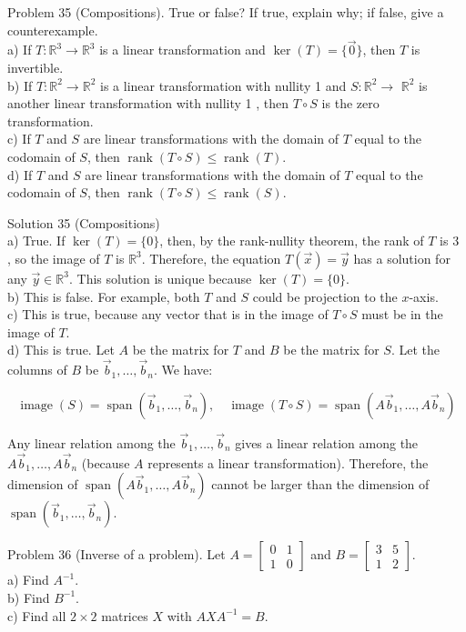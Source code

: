 \documentclass[10pt]{article}
\begin{document}
Problem 35 (Compositions). True or false? If true, explain why; if false, give a counterexample.\\
a) If $T: \mathbb{R}^{3} \rightarrow \mathbb{R}^{3}$ is a linear transformation and $\operatorname{ker}(T)=\{\overrightarrow{0}\}$, then $T$ is invertible.\\
b) If $T: \mathbb{R}^{2} \rightarrow \mathbb{R}^{2}$ is a linear transformation with nullity 1 and $S: \mathbb{R}^{2} \rightarrow$ $\mathbb{R}^{2}$ is another linear transformation with nullity 1 , then $T \circ S$ is the zero transformation.\\
c) If $T$ and $S$ are linear transformations with the domain of $T$ equal to the codomain of $S$, then $\operatorname{rank}(T \circ S) \leq \operatorname{rank}(T)$.\\
d) If $T$ and $S$ are linear transformations with the domain of $T$ equal to the codomain of $S$, then $\operatorname{rank}(T \circ S) \leq \operatorname{rank}(S)$.

Solution 35 (Compositions)\\
a) True. If $\operatorname{ker}(T)=\{0\}$, then, by the rank-nullity theorem, the rank of $T$ is 3 , so the image of $T$ is $\mathbb{R}^{3}$. Therefore, the equation $T(\vec{x})=\vec{y}$ has a solution for any $\vec{y} \in \mathbb{R}^{3}$. This solution is unique because $\operatorname{ker}(T)=\{0\}$.\\
b) This is false. For example, both $T$ and $S$ could be projection to the $x$-axis.\\
c) This is true, because any vector that is in the image of $T \circ S$ must be in the image of $T$.\\
d) This is true. Let $A$ be the matrix for $T$ and $B$ be the matrix for $S$. Let the columns of $B$ be $\vec{b}_{1}, \ldots, \vec{b}_{n}$. We have:

$$
\operatorname{image}(S)=\operatorname{span}\left(\vec{b}_{1}, \ldots, \vec{b}_{n}\right), \quad \operatorname{image}(T \circ S)=\operatorname{span}\left(A \vec{b}_{1}, \ldots, A \vec{b}_{n}\right)
$$

Any linear relation among the $\vec{b}_{1}, \ldots, \vec{b}_{n}$ gives a linear relation among the $A \vec{b}_{1}, \ldots, A \vec{b}_{n}$ (because $A$ represents a linear transformation). Therefore, the dimension of $\operatorname{span}\left(A \vec{b}_{1}, \ldots, A \vec{b}_{n}\right)$ cannot be larger than the dimension of $\operatorname{span}\left(\vec{b}_{1}, \ldots, \vec{b}_{n}\right)$.

Problem 36 (Inverse of a problem). Let $A=\left[\begin{array}{ll}0 & 1 \\ 1 & 0\end{array}\right]$ and $B=\left[\begin{array}{ll}3 & 5 \\ 1 & 2\end{array}\right]$.\\
a) Find $A^{-1}$.\\
b) Find $B^{-1}$.\\
c) Find all $2 \times 2$ matrices $X$ with $A X A^{-1}=B$.
\end{document}
